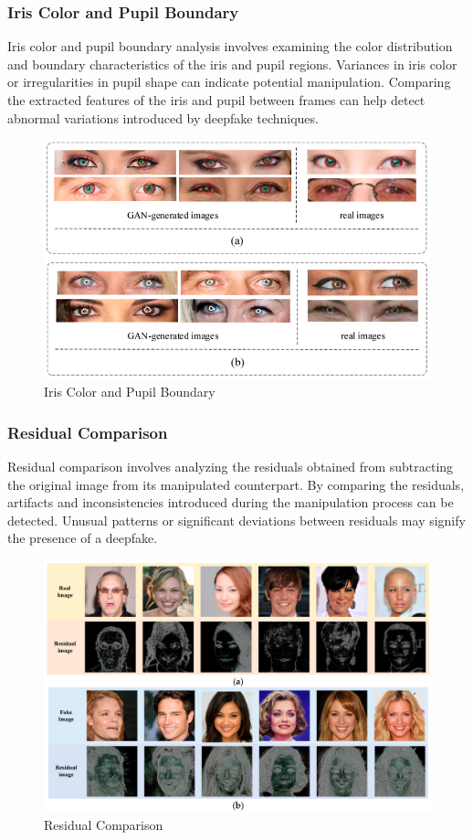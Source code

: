 \subsubsection{Iris Color and Pupil Boundary}

Iris color and pupil boundary analysis involves examining the color distribution and boundary characteristics of the iris and pupil regions. Variances in iris color or irregularities in pupil shape can indicate potential manipulation. Comparing the extracted features of the iris and pupil between frames can help detect abnormal variations introduced by deepfake techniques.
\begin{figure}[htbp]
    \centering
    \includegraphics[width=5in]{img/pupil.png}
    \caption{{Iris Color and Pupil Boundary}}
\end{figure}


\subsubsection{Residual Comparison}

Residual comparison involves analyzing the residuals obtained from subtracting the original image from its manipulated counterpart. By comparing the residuals, artifacts and inconsistencies introduced during the manipulation process can be detected. Unusual patterns or significant deviations between residuals may signify the presence of a deepfake.
\begin{figure}[htbp]
    \centering
    \includegraphics[width=5in]{img/residual.png}
    \caption{{Residual Comparison}}
\end{figure}


